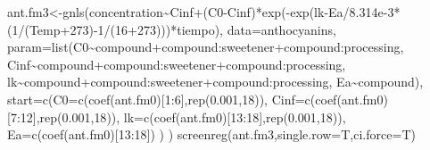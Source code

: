 \documentclass[
]{article}
\newenvironment{Shaded}{\begin{snugshade}}{\end{snugshade}}
\newcommand{\AttributeTok}[1]{\textcolor[rgb]{0.77,0.63,0.00}{#1}}
\newcommand{\DecValTok}[1]{\textcolor[rgb]{0.00,0.00,0.81}{#1}}
\newcommand{\FloatTok}[1]{\textcolor[rgb]{0.00,0.00,0.81}{#1}}
\newcommand{\FunctionTok}[1]{\textcolor[rgb]{0.00,0.00,0.00}{#1}}
\newcommand{\NormalTok}[1]{#1}
\newcommand{\OtherTok}[1]{\textcolor[rgb]{0.56,0.35,0.01}{#1}}
\newcommand{\SpecialCharTok}[1]{\textcolor[rgb]{0.00,0.00,0.00}{#1}}
\begin{document}
\begin{Shaded}
\begin{Highlighting}[]
\NormalTok{ant.fm3}\OtherTok{\textless{}{-}}\FunctionTok{gnls}\NormalTok{(concentration}\SpecialCharTok{\textasciitilde{}}\NormalTok{Cinf}\SpecialCharTok{+}\NormalTok{(C0}\SpecialCharTok{{-}}\NormalTok{Cinf)}\SpecialCharTok{*}\FunctionTok{exp}\NormalTok{(}\SpecialCharTok{{-}}\FunctionTok{exp}\NormalTok{(lk}\SpecialCharTok{{-}}\NormalTok{Ea}\SpecialCharTok{/}\FloatTok{8.314e{-}3}\SpecialCharTok{*}\NormalTok{(}\DecValTok{1}\SpecialCharTok{/}\NormalTok{(Temp}\SpecialCharTok{+}\DecValTok{273}\NormalTok{)}\SpecialCharTok{{-}}\DecValTok{1}\SpecialCharTok{/}\NormalTok{(}\DecValTok{16}\SpecialCharTok{+}\DecValTok{273}\NormalTok{)))}\SpecialCharTok{*}\NormalTok{tiempo),}
               \AttributeTok{data=}\NormalTok{anthocyanins,}
               \AttributeTok{param=}\FunctionTok{list}\NormalTok{(C0}\SpecialCharTok{\textasciitilde{}}\NormalTok{compound}\SpecialCharTok{+}\NormalTok{compound}\SpecialCharTok{:}\NormalTok{sweetener}\SpecialCharTok{+}\NormalTok{compound}\SpecialCharTok{:}\NormalTok{processing,}
\NormalTok{                          Cinf}\SpecialCharTok{\textasciitilde{}}\NormalTok{compound}\SpecialCharTok{+}\NormalTok{compound}\SpecialCharTok{:}\NormalTok{sweetener}\SpecialCharTok{+}\NormalTok{compound}\SpecialCharTok{:}\NormalTok{processing,}
\NormalTok{                          lk}\SpecialCharTok{\textasciitilde{}}\NormalTok{compound}\SpecialCharTok{+}\NormalTok{compound}\SpecialCharTok{:}\NormalTok{sweetener}\SpecialCharTok{+}\NormalTok{compound}\SpecialCharTok{:}\NormalTok{processing,}
\NormalTok{                          Ea}\SpecialCharTok{\textasciitilde{}}\NormalTok{compound),}
               \AttributeTok{start=}\FunctionTok{c}\NormalTok{(}\AttributeTok{C0=}\FunctionTok{c}\NormalTok{(}\FunctionTok{coef}\NormalTok{(ant.fm0)[}\DecValTok{1}\SpecialCharTok{:}\DecValTok{6}\NormalTok{],}\FunctionTok{rep}\NormalTok{(}\FloatTok{0.001}\NormalTok{,}\DecValTok{18}\NormalTok{)),}
                       \AttributeTok{Cinf=}\FunctionTok{c}\NormalTok{(}\FunctionTok{coef}\NormalTok{(ant.fm0)[}\DecValTok{7}\SpecialCharTok{:}\DecValTok{12}\NormalTok{],}\FunctionTok{rep}\NormalTok{(}\FloatTok{0.001}\NormalTok{,}\DecValTok{18}\NormalTok{)),}
                       \AttributeTok{lk=}\FunctionTok{c}\NormalTok{(}\FunctionTok{coef}\NormalTok{(ant.fm0)[}\DecValTok{13}\SpecialCharTok{:}\DecValTok{18}\NormalTok{],}\FunctionTok{rep}\NormalTok{(}\FloatTok{0.001}\NormalTok{,}\DecValTok{18}\NormalTok{)),}
                       \AttributeTok{Ea=}\FunctionTok{c}\NormalTok{(}\FunctionTok{coef}\NormalTok{(ant.fm0)[}\DecValTok{13}\SpecialCharTok{:}\DecValTok{18}\NormalTok{])}
\NormalTok{               )}
\NormalTok{)}
\FunctionTok{screenreg}\NormalTok{(ant.fm3,}\AttributeTok{single.row=}\NormalTok{T,}\AttributeTok{ci.force=}\NormalTok{T)}
\end{Highlighting}
\end{Shaded}
\end{document}
